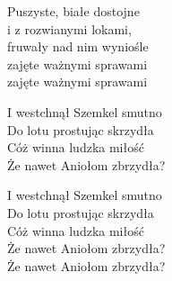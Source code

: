 \begin{text}
Puszyste, białe dostojne\\
i z rozwianymi lokami,\\
fruwały nad nim wyniośle\\
zajęte ważnymi sprawami\\
zajęte ważnymi sprawami

\vin I westchnął Szemkel smutno\\
\vin Do lotu prostując skrzydła\\
\vin Cóż winna ludzka miłość\\
\vin Że nawet Aniołom zbrzydła?

\vin I westchnął Szemkel smutno\\
\vin Do lotu prostując skrzydła\\
\vin Cóż winna ludzka miłość\\
\vin Że nawet Aniołom zbrzydła?\\
\vin Że nawet Aniołom zbrzydła?
\end{text}
